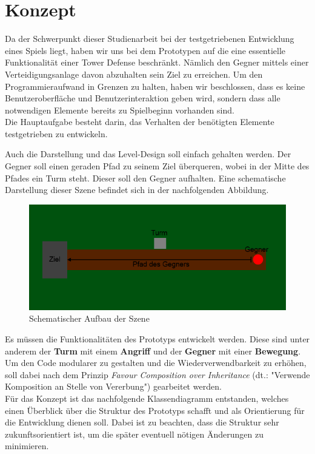 \section{Konzept}\label{sec:Konzept}

Da der Schwerpunkt dieser Studienarbeit bei der testgetriebenen Entwicklung eines Spiels liegt, haben wir uns bei dem Prototypen auf die eine essentielle Funktionalität einer Tower Defense beschränkt. Nämlich den Gegner mittels einer Verteidigungsanlage davon abzuhalten sein Ziel zu erreichen. Um den Programmieraufwand in Grenzen zu halten, haben wir beschlossen, dass es keine Benutzeroberfläche und Benutzerinteraktion geben wird, sondern dass alle notwendigen Elemente bereits zu Spielbeginn vorhanden sind.\\
Die Hauptaufgabe besteht darin, das Verhalten der benötigten Elemente testgetrieben zu entwickeln.

Auch die Darstellung und das Level-Design soll einfach gehalten werden. Der Gegner soll einen geraden Pfad zu seinem Ziel überqueren, wobei in der Mitte des Pfades ein Turm steht. Dieser soll den Gegner aufhalten. Eine schematische Darstellung dieser Szene befindet sich in der nachfolgenden Abbildung.\\

\begin{figure}[h]
\centering
\includegraphics[width=1\linewidth]{./images/Kapitel_PrototypKonzept/Schematischer_Aufbau_der_Szene.png}
\caption[Schematischer Aufbau der Szene]{Schematischer Aufbau der Szene}
\label{fig:Schematischer_Aufbau_der_Szene}
\end{figure}

Es müssen die Funktionalitäten des Prototyps entwickelt werden. Diese sind unter anderem der \textbf{Turm} mit einem \textbf{Angriff} und der \textbf{Gegner} mit einer \textbf{Bewegung}. Um den Code modularer zu gestalten und die Wiederverwendbarkeit zu erhöhen, soll dabei nach dem Prinzip \textit{Favour Composition over Inheritance} (dt.: "Verwende Komposition an Stelle von Vererbung") gearbeitet werden.\\
Für das Konzept ist das nachfolgende Klassendiagramm entstanden, welches einen Überblick über die Struktur des Prototyps schafft und als Orientierung für die Entwicklung dienen soll. Dabei ist zu beachten, dass die Struktur sehr zukunftsorientiert ist, um die später eventuell nötigen Änderungen zu minimieren.\\

